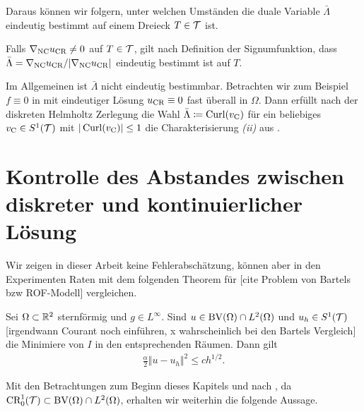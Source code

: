 Daraus können wir folgern, unter welchen Umständen die duale Variable
$\bar\Lambda$ eindeutig bestimmt auf einem Dreieck $T\in\mathcal{T}$ ist.

\begin{remark}
  Falls $\nabla_\textup{NC}u_\textup{CR}\neq 0$ auf $T\in\mathcal{T}$, gilt nach Definition der
  Signumfunktion, dass $\bar\Lambda=\nabla_\textup{NC}u_\textup{CR}/|\nabla_\textup{NC}u_\textup{CR}|$ eindeutig
  bestimmt ist auf $T$.

  Im Allgemeinen ist $\bar\Lambda$ nicht eindeutig bestimmbar. 
  Betrachten wir zum Beispiel $f\equiv 0$ in  mit
  eindeutiger Lösung $u_\textup{CR}\equiv 0$ fast überall in $\Omega$. 
  Dann erfüllt nach der diskreten Helmholtz Zerlegung \cite[S. 193, Theorem
  3.32]{Car09b} die Wahl $\bar\Lambda\coloneqq \operatorname{Curl}(v_{\textup{C}})$ für ein beliebiges
  $v_{\textup{C}}\in S^1(\mathcal{T})$ mit $|\operatorname{Curl}(v_{\textup{C}})|\leq 1$ die Charakterisierung
  \textit{(ii)} aus .
\end{remark}


\section{Kontrolle des Abstandes zwischen diskreter und kontinuierlicher
Lösung}
Wir zeigen in dieser Arbeit keine Fehlerabschätzung, können aber in den 
Experimenten Raten mit dem folgenden Theorem für
[cite Problem von Bartels bzw ROF-Modell] vergleichen.
\begin{theorem}
  \label{thm:errorEstimateCourant}
  Sei $\Omega\subset\mathbb{R}^2$ sternförmig und $g\in L^\infty$.
  Sind $u\in\textup{BV}(\Omega)\cap L^2(\Omega)$ und $u_h\in S^1(\mathcal{T})$ [irgendwann
  Courant noch einführen, x wahrscheinlich bei den Bartels Vergleich] die 
  Minimiere von $I$ in den entsprechenden Räumen.
  Dann gilt 
  \begin{align*}
    \frac{\alpha}{2}\Vert u-u_h\Vert^2\leq
    ch^{1/2}.
  \end{align*}
\end{theorem}

Mit den Betrachtungen zum Beginn dieses Kapitels und nach 
, da $\textup{CR}^1_0(\mathcal{T})\subset\textup{BV}(\Omega)\cap L^2(\Omega)$,
erhalten wir weiterhin die folgende Aussage.

